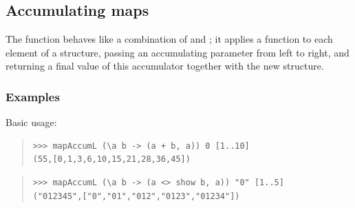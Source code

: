 \subsection{Accumulating maps}
\begin{haddockdesc}
\item[\begin{tabular}{@{}l}
mapAccumL :: Traversable t => (s -> a -> (s, b)) -> s -> t a -> (s, t b)
\end{tabular}]
{\haddockbegindoc
The  function behaves like a combination of 
 and ; it applies a function to each element of a structure,
 passing an accumulating parameter from left to right, and returning
 a final value of this accumulator together with the new structure.\par
\subsubsection*{\textbf{Examples}}
Basic usage:\par
\begin{quote}
{\haddockverb\begin{verbatim}
>>> mapAccumL (\a b -> (a + b, a)) 0 [1..10]
(55,[0,1,3,6,10,15,21,28,36,45])

\end{verbatim}}
\end{quote}
\begin{quote}
{\haddockverb\begin{verbatim}
>>> mapAccumL (\a b -> (a <> show b, a)) "0" [1..5]
("012345",["0","01","012","0123","01234"])

\end{verbatim}}
\end{quote}}
\end{haddockdesc}
